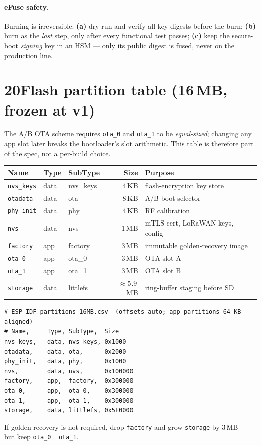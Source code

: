 \paragraph{eFuse safety.} Burning is irreversible: \textbf{(a)} dry-run and verify all key digests
before the burn; \textbf{(b)} burn as the \emph{last} step, only after every functional test passes;
\textbf{(c)} keep the secure-boot \emph{signing} key in an HSM — only its public digest is fused,
never on the production line.

\section*{20\quad Flash partition table (16\,MB, frozen at v1)}
The A/B OTA scheme requires \texttt{ota\_0} and \texttt{ota\_1} to be \emph{equal-sized}; changing any
app slot later breaks the bootloader's slot arithmetic. This table is therefore part of the spec, not
a per-build choice.
\begin{center}
\renewcommand{\arraystretch}{1.18}\small
\begin{tabularx}{\textwidth}{@{}l l l r X@{}}
\toprule
\textbf{Name} & \textbf{Type} & \textbf{SubType} & \textbf{Size} & \textbf{Purpose} \\
\midrule
\texttt{nvs\_keys} & data & nvs\_keys & 4\,KB & flash-encryption key store \\
\texttt{otadata}   & data & ota       & 8\,KB & A/B boot selector \\
\texttt{phy\_init} & data & phy       & 4\,KB & RF calibration \\
\texttt{nvs}       & data & nvs       & 1\,MB & mTLS cert, LoRaWAN keys, config \\
\texttt{factory}   & app  & factory   & 3\,MB & immutable golden-recovery image \\
\texttt{ota\_0}    & app  & ota\_0    & 3\,MB & OTA slot A \\
\texttt{ota\_1}    & app  & ota\_1    & 3\,MB & OTA slot B \\
\texttt{storage}   & data & littlefs  & $\approx$5.9\,MB & ring-buffer staging before SD \\
\bottomrule
\end{tabularx}
\end{center}
\begin{lstlisting}[style=js]
# ESP-IDF partitions-16MB.csv  (offsets auto; app partitions 64 KB-aligned)
# Name,     Type, SubType,  Size
nvs_keys,   data, nvs_keys, 0x1000
otadata,    data, ota,      0x2000
phy_init,   data, phy,      0x1000
nvs,        data, nvs,      0x100000
factory,    app,  factory,  0x300000
ota_0,      app,  ota_0,    0x300000
ota_1,      app,  ota_1,    0x300000
storage,    data, littlefs, 0x5F0000
\end{lstlisting}
\noindent If golden-recovery is not required, drop \texttt{factory} and grow \texttt{storage} by
3\,MB — but keep \texttt{ota\_0}\,=\,\texttt{ota\_1}.

